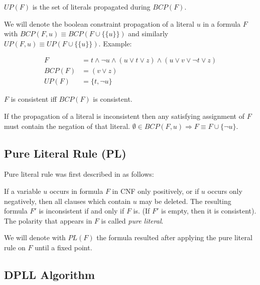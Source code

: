 \begin{mydef}
$UP(F)$ is the set of literals propagated during $BCP(F)$.
\end{mydef}

We will denote the boolean constraint propagation of a literal $u$ in a
formula $F$ with $BCP(F, u) \equiv BCP(F \cup \{\{ u \}\})$
and similarly $UP(F, u) \equiv UP(F \cup \{\{ u \}\})$. Example:

\begin{align}
  F &= t \land \neg u \land (u \lor t \lor z) \land (u \lor v \lor \neg t \lor z) \\
  BCP(F) &= (v \lor z) \\
  UP(F) &= \{ t, \neg u \}
\end{align}

\begin{myprop}
  $F$ is consistent iff $BCP(F)$ is consistent.
\end{myprop}

\begin{myprop}
  If the propagation of a literal is inconsistent then any satisfying
  assignment of $F$ must contain the negation of that literal.
  $\emptyset \in BCP(F, u) \Rightarrow F \equiv F \cup \{\neg u\}$.
\end{myprop}


\subsection{Pure Literal Rule (PL)}
\label{ssec:pl}

Pure literal rule was first described in \cite{Davis:1960:CPQ:321033.321034}
as follows:

\begin{mydef}
  If a variable $u$ occurs in formula $F$ in CNF only positively, or
  if $u$ occurs only negatively, then all clauses which contain $u$
  may be deleted. The resulting formula $F'$ is inconsistent
  if and only if $F$ is. (If $F'$ is empty, then it is consistent).
  The polarity that appears in $F$ is called \emph{pure literal}.
\end{mydef}

We will denote with $PL(F)$ the formula resulted after applying
the pure literal rule on $F$ until a fixed point.


\subsection{DPLL Algorithm}

